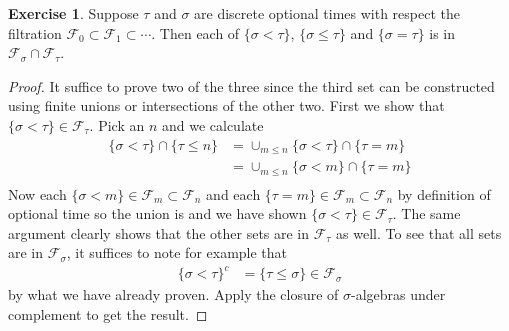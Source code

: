 \documentclass{amsart}
\theoremstyle{remark}
\theoremstyle{definition}
\newtheorem{ex}[thm]{Exercise}
\begin{document}
\begin{ex}Suppose $\tau$ and $\sigma$ are discrete optional
  times with respect the filtration $\mathcal{F}_0 \subset
  \mathcal{F}_1 \subset \cdots$. Then each of $\lbrace \sigma < \tau
  \rbrace$, $\lbrace \sigma \leq \tau
  \rbrace$ and $\lbrace \sigma = \tau
  \rbrace$ is in $\mathcal{F}_{\sigma} \cap \mathcal{F}_{\tau}$.
\end{ex}
\begin{proof}
It suffice to prove two of the three since the third set can be
constructed using finite unions or intersections of the other two.
First we show that $\lbrace \sigma < \tau \rbrace \in
\mathcal{F}_\tau$.
Pick an $n$ and we calculate
\begin{align*}
\lbrace \sigma < \tau \rbrace \cap \lbrace \tau \leq n \rbrace &=
\cup_{m\leq n}\lbrace \sigma < \tau \rbrace \cap \lbrace \tau = m
\rbrace \\
&= \cup_{m\leq n}\lbrace \sigma < m \rbrace \cap \lbrace \tau = m
\rbrace \\
\end{align*}
Now each $\lbrace \sigma < m \rbrace \in \mathcal{F}_m \subset
\mathcal{F}_n$ and each $\lbrace \tau = m
\rbrace \in \mathcal{F}_m \subset
\mathcal{F}_n$ by definition of optional time so the union is and we
have shown $\lbrace \sigma < \tau \rbrace \in \mathcal{F}_\tau$.  The
same argument clearly shows that the other sets are in
$\mathcal{F}_\tau$ as well.  To see that all sets are in
$\mathcal{F}_\sigma$, it suffices to note for example that 
\begin{align*}
\lbrace \sigma < \tau \rbrace^c &= \lbrace \tau \leq \sigma \rbrace
\in \mathcal{F}_\sigma
\end{align*}
by what we have already proven. Apply the closure of $\sigma$-algebras
under complement to get the result.
\end{proof}
\end{document}
